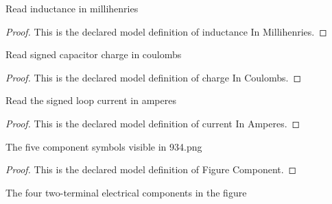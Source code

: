 \begin{definition}
  \label{def:physics:phyx-mini-0934:phyxminiproblems-problemphyxmini0934-inductanceinmillihenries}
  Read inductance in millihenries
\end{definition}
\begin{proof}
  This is the declared model definition of inductance In Millihenries.
\end{proof}
\begin{definition}
  \label{def:physics:phyx-mini-0934:phyxminiproblems-problemphyxmini0934-chargeincoulombs}
  Read signed capacitor charge in coulombs
\end{definition}
\begin{proof}
  This is the declared model definition of charge In Coulombs.
\end{proof}
\begin{definition}
  \label{def:physics:phyx-mini-0934:phyxminiproblems-problemphyxmini0934-currentinamperes}
  Read the signed loop current in amperes
\end{definition}
\begin{proof}
  This is the declared model definition of current In Amperes.
\end{proof}
\begin{definition}
  \label{def:physics:phyx-mini-0934:phyxminiproblems-problemphyxmini0934-figurecomponent}
  The five component symbols visible in 934.png
\end{definition}
\begin{proof}
  This is the declared model definition of Figure Component.
\end{proof}
\begin{definition}
  \label{def:physics:phyx-mini-0934:phyxminiproblems-problemphyxmini0934-twoterminalcomponent}
  The four two-terminal electrical components in the figure
\end{definition}

